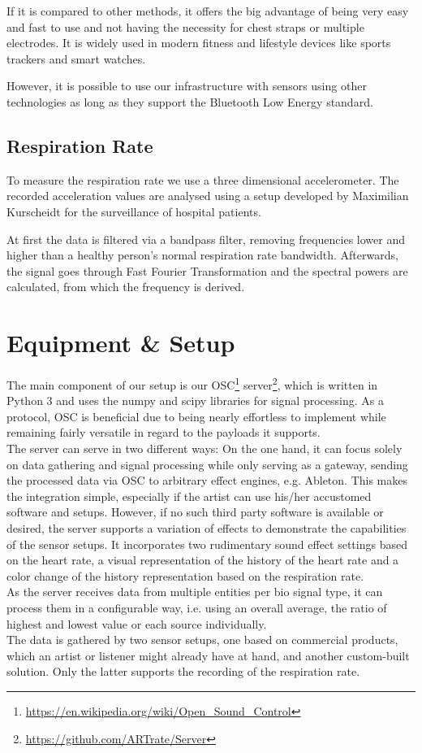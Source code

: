 \documentclass{sigchi-ext}
\begin{document}
If it is compared to other methods, it offers the big advantage of being very easy and fast
to use and not having the necessity for chest straps or multiple electrodes. It is widely used
in modern fitness and lifestyle devices like sports trackers and smart watches.

However, it is possible to use our infrastructure with sensors using other technologies
as long as they support the Bluetooth Low Energy standard.

\subsection{Respiration Rate}

To measure the respiration rate we use a three dimensional accelerometer. The recorded
acceleration values are analysed using a setup developed by Maximilian Kurscheidt for
the surveillance of hospital patients\cite{kurscheidt2016open}.

At first the data is filtered via a bandpass filter, removing frequencies lower and higher
than a healthy person's normal respiration rate bandwidth. Afterwards, the signal goes through
Fast Fourier Transformation and the spectral powers are calculated, from which the frequency is
derived. %

\section{Equipment \& Setup}

The main component of our setup is our OSC\footnote{\url{https://en.wikipedia.org/wiki/Open_Sound_Control}}
server\footnote{\url{https://github.com/ARTrate/Server}}, which is written in Python 3 and uses the numpy and
scipy libraries for signal processing. As a protocol, OSC is beneficial due to being nearly effortless
to implement while remaining fairly versatile in regard to the payloads it supports. \\
The server can serve in two different ways: On the one hand, it can focus solely on data gathering and signal 
processing while only serving as a gateway, sending the processed data via OSC to arbitrary effect
engines, e.g. Ableton. This makes the integration simple, especially if the artist can use his/her accustomed
software and setups. However, if no such third party software is available or desired, the server supports a
variation of effects to demonstrate the capabilities of the sensor setups. It incorporates two rudimentary
sound effect settings based on the heart rate, a visual representation of the history of the heart rate
and a color change of the history representation based on the respiration rate.\\
As the server receives data from multiple entities per bio signal type, it can process them in a 
configurable way, i.e. using an overall average, the ratio of highest and lowest value or each source
individually. \\
The data is gathered by two sensor setups, one based on commercial products, which an artist or
listener might already have at hand, and another custom-built solution. Only the latter supports
the recording of the respiration rate.
\end{document}
